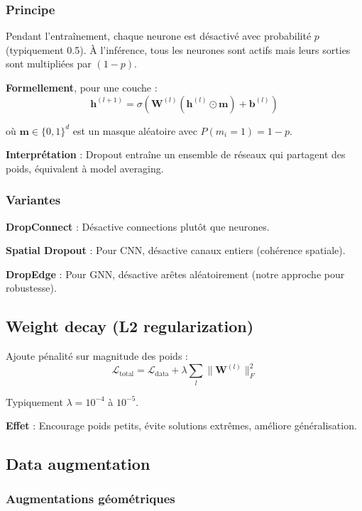 \subsubsection{Principe}

Pendant l'entraînement, chaque neurone est désactivé avec probabilité $p$ (typiquement 0.5). À l'inférence, tous les neurones sont actifs mais leurs sorties sont multipliées par $(1-p)$.

\textbf{Formellement}, pour une couche :
\[
\mathbf{h}^{(l+1)} = \sigma\left(\mathbf{W}^{(l)} (\mathbf{h}^{(l)} \odot \mathbf{m}) + \mathbf{b}^{(l)}\right)
\]

où $\mathbf{m} \in \{0, 1\}^{d}$ est un masque aléatoire avec $P(m_i = 1) = 1-p$.

\textbf{Interprétation} : Dropout entraîne un ensemble de réseaux qui partagent des poids, équivalent à model averaging.

\subsubsection{Variantes}

\textbf{DropConnect} : Désactive connections plutôt que neurones.

\textbf{Spatial Dropout} : Pour CNN, désactive canaux entiers (cohérence spatiale).

\textbf{DropEdge} : Pour GNN, désactive arêtes aléatoirement (notre approche pour robustesse).

\subsection{Weight decay (L2 regularization)}

Ajoute pénalité sur magnitude des poids :
\[
\mathcal{L}_{\text{total}} = \mathcal{L}_{\text{data}} + \lambda \sum_l \|\mathbf{W}^{(l)}\|_F^2
\]

Typiquement $\lambda = 10^{-4}$ à $10^{-5}$.

\textbf{Effet} : Encourage poids petits, évite solutions extrêmes, améliore généralisation.

\subsection{Data augmentation}

\subsubsection{Augmentations géométriques}

